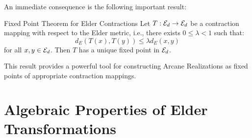 \begin{twocolumnlayout}
An immediate consequence is the following important result:

\begin{corollary}{Fixed Point Theorem for Elder Contractions}{}
Let $T: \mathcal{E}_{d} \to \mathcal{E}_{d}$ be a contraction mapping with respect to the Elder metric, i.e., there exists $0 \leq \lambda < 1$ such that:
\begin{equation}
d_E(T(x), T(y)) \leq \lambda d_E(x, y)
\end{equation}
for all $x, y \in \mathcal{E}_{d}$. Then $T$ has a unique fixed point in $\mathcal{E}_{d}$.
\end{corollary}

This result provides a powerful tool for constructing Arcane Realizations as fixed points of appropriate contraction mappings.
\end{twocolumnlayout}

\section{Algebraic Properties of Elder Transformations}

